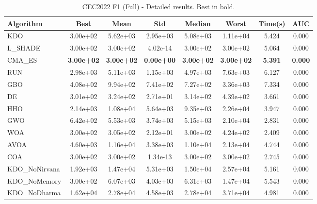 \begin{table}[H]
\centering\small
\caption{CEC2022 F1 (Full) - Detailed results. Best in bold.}
\label{tab:cec2022_F1}
\begin{tabular}{lccccccc}
\toprule
\textbf{Algorithm} & \textbf{Best} & \textbf{Mean} & \textbf{Std} & \textbf{Median} & \textbf{Worst} & \textbf{Time(s)} & \textbf{AUC} \\
\midrule
KDO & 3.00e+02 & 5.62e+03 & 2.95e+03 & 5.08e+03 & 1.11e+04 & 5.424 & 0.000 \\
L_SHADE & 3.00e+02 & 3.00e+02 & 4.02e-14 & 3.00e+02 & 3.00e+02 & 5.064 & 0.000 \\
CMA_ES & \textbf{3.00e+02} & \textbf{3.00e+02} & \textbf{0.00e+00} & \textbf{3.00e+02} & \textbf{3.00e+02} & \textbf{5.391} & \textbf{0.000} \\
RUN & 2.98e+03 & 5.11e+03 & 1.15e+03 & 4.97e+03 & 7.63e+03 & 6.127 & 0.000 \\
GBO & 4.08e+02 & 9.94e+02 & 7.41e+02 & 7.27e+02 & 3.36e+03 & 7.334 & 0.000 \\
DE & 3.01e+02 & 3.24e+02 & 2.71e+01 & 3.14e+02 & 4.39e+02 & 3.661 & 0.000 \\
HHO & 2.14e+03 & 1.08e+04 & 5.64e+03 & 9.35e+03 & 2.26e+04 & 3.947 & 0.000 \\
GWO & 6.42e+02 & 5.53e+03 & 3.74e+03 & 5.15e+03 & 2.10e+04 & 2.831 & 0.000 \\
WOA & 3.00e+02 & 3.05e+02 & 2.12e+01 & 3.00e+02 & 4.24e+02 & 2.409 & 0.000 \\
AVOA & 4.60e+03 & 1.16e+04 & 3.38e+03 & 1.10e+04 & 2.13e+04 & 4.744 & 0.000 \\
COA & 3.00e+02 & 3.00e+02 & 1.34e-13 & 3.00e+02 & 3.00e+02 & 2.745 & 0.000 \\
KDO_NoNirvana & 1.92e+03 & 1.47e+04 & 5.31e+03 & 1.50e+04 & 2.57e+04 & 5.161 & 0.000 \\
KDO_NoMemory & 3.00e+02 & 6.07e+03 & 4.03e+03 & 6.31e+03 & 1.47e+04 & 5.543 & 0.000 \\
KDO_NoDharma & 1.62e+04 & 2.78e+04 & 4.58e+03 & 2.78e+04 & 3.71e+04 & 4.981 & 0.000 \\
\bottomrule
\end{tabular}
\end{table}
